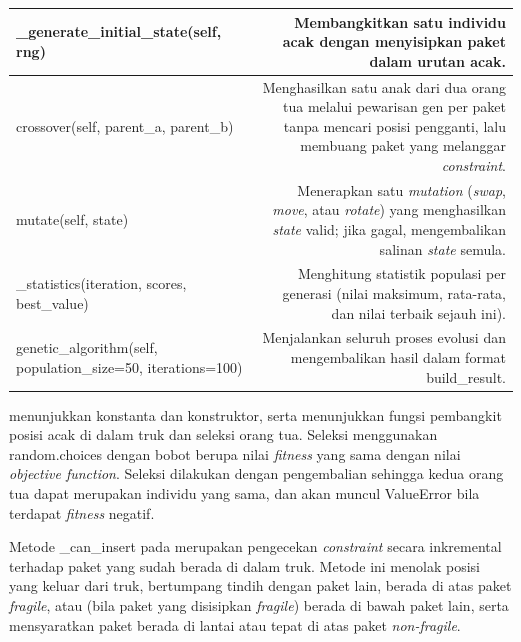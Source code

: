 \begin{longtable}{|K|D|}
\_generate\_initial\_state(self, rng) & Membangkitkan satu individu acak dengan menyisipkan paket dalam urutan acak. \\ \hline
crossover(self, parent\_a, parent\_b) & Menghasilkan satu anak dari dua orang tua melalui pewarisan gen per paket tanpa mencari posisi pengganti, lalu membuang paket yang melanggar \textit{constraint}. \\ \hline
mutate(self, state) & Menerapkan satu \textit{mutation} (\textit{swap}, \textit{move}, atau \textit{rotate}) yang menghasilkan \textit{state} valid; jika gagal, mengembalikan salinan \textit{state} semula. \\ \hline
\_statistics(iteration, scores, best\_value) & Menghitung statistik populasi per generasi (nilai maksimum, rata-rata, dan nilai terbaik sejauh ini). \\ \hline
genetic\_algorithm(self, population\_size=50, iterations=100) & Menjalankan seluruh proses evolusi dan mengembalikan hasil dalam format build\_result. \\ \hline
\end{longtable}

 menunjukkan konstanta dan konstruktor, serta  menunjukkan fungsi pembangkit posisi acak di dalam truk dan seleksi orang tua. Seleksi menggunakan random.choices dengan bobot berupa nilai \textit{fitness} yang sama dengan nilai \textit{objective function}. Seleksi dilakukan dengan pengembalian sehingga kedua orang tua dapat merupakan individu yang sama, dan akan muncul ValueError bila terdapat \textit{fitness} negatif.



Metode \_can\_insert pada  merupakan pengecekan \textit{constraint} secara inkremental terhadap paket yang sudah berada di dalam truk. Metode ini menolak posisi yang keluar dari truk, bertumpang tindih dengan paket lain, berada di atas paket \textit{fragile}, atau (bila paket yang disisipkan \textit{fragile}) berada di bawah paket lain, serta mensyaratkan paket berada di lantai atau tepat di atas paket \textit{non-fragile}.


